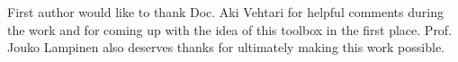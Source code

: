\documentclass[11pt,a4paper,oneside,english]{report}
\begin{document}
First author would like to thank Doc. Aki Vehtari for helpful comments
during the work and for coming up with the idea of this toolbox in the
first place. Prof. Jouko Lampinen also deserves thanks for ultimately
making this work possible.

\newpage

%
  
%

\clearpage
\newpage



%
  
%

\clearpage
\newpage




%
  
%

\clearpage
\newpage




%
  
%

\clearpage
\newpage





%
  
%

\clearpage
\newpage




%

\appendix


\end{document}
